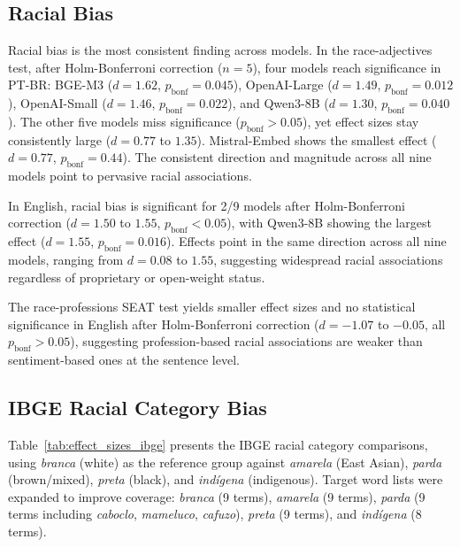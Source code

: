 \documentclass{sbc2019}
\begin{document}
\subsection{Racial Bias}

Racial bias is the most consistent finding across models. In the race-adjectives test, after Holm-Bonferroni correction ($n = 5$), four models reach significance in PT-BR: BGE-M3 ($d = 1.62$, $p_{\mathrm{bonf}} = 0.045$), OpenAI-Large ($d = 1.49$, $p_{\mathrm{bonf}} = 0.012$), OpenAI-Small ($d = 1.46$, $p_{\mathrm{bonf}} = 0.022$), and Qwen3-8B ($d = 1.30$, $p_{\mathrm{bonf}} = 0.040$). The other five models miss significance ($p_{\mathrm{bonf}} > 0.05$), yet effect sizes stay consistently large ($d = 0.77$ to $1.35$). Mistral-Embed shows the smallest effect ($d = 0.77$, $p_{\mathrm{bonf}} = 0.44$). The consistent direction and magnitude across all nine models point to pervasive racial associations.

In English, racial bias is significant for 2/9 models after Holm-Bonferroni correction ($d = 1.50$ to $1.55$, $p_{\mathrm{bonf}} < 0.05$), with Qwen3-8B showing the largest effect ($d = 1.55$, $p_{\mathrm{bonf}} = 0.016$). Effects point in the same direction across all nine models, ranging from $d = 0.08$ to $1.55$, suggesting widespread racial associations regardless of proprietary or open-weight status.

The race-professions SEAT test yields smaller effect sizes and no statistical significance in English after Holm-Bonferroni correction ($d = -1.07$ to $-0.05$, all $p_{\mathrm{bonf}} > 0.05$), suggesting profession-based racial associations are weaker than sentiment-based ones at the sentence level.

\subsection{IBGE Racial Category Bias}

Table~\ref{tab:effect_sizes_ibge} presents the IBGE racial category comparisons, using \textit{branca} (white) as the reference group against \textit{amarela} (East Asian), \textit{parda} (brown/mixed), \textit{preta} (black), and \textit{ind\'{i}gena} (indigenous). Target word lists were expanded to improve coverage: \textit{branca} (9 terms), \textit{amarela} (9 terms), \textit{parda} (9 terms including \textit{caboclo}, \textit{mameluco}, \textit{cafuzo}), \textit{preta} (9 terms), and \textit{ind\'{i}gena} (8 terms).
\end{document}
